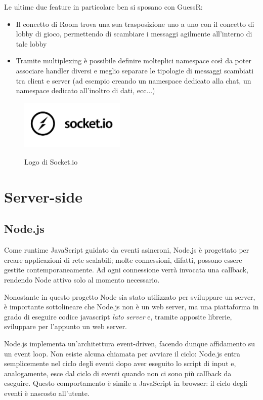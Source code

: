 \noindent Le ultime due feature in particolare ben si sposano con GuessR:
\begin{itemize}
    \item Il concetto di Room trova una sua trasposizione uno a uno con il concetto di lobby di gioco, permettendo di scambiare i messaggi agilmente all'interno di tale lobby
    \item Tramite multiplexing è possibile definire molteplici namespace così da poter associare handler diversi e meglio separare le tipologie di messaggi scambiati tra client e server (ad esempio creando un namespace dedicato alla chat, un namespace dedicato all'inoltro di dati, ecc...)
\end{itemize}


\begin{figure}[H]
    \caption{Logo di Socket.io}
    \centering
    \includegraphics[width=50mm]{img/logos/socketIO_logo.jpg}
    \label{fig:sockIO_logo}
\end{figure}

\section{Server-side}
\label{sub:server-tech}


\subsection{Node.js}
Come runtime JavaScript guidato da eventi asincroni, Node.js è progettato per creare applicazioni di rete scalabili; molte connessioni, difatti, possono essere gestite contemporaneamente. Ad ogni connessione verrà invocata una callback, rendendo Node attivo solo al momento necessario.\newline

\noindent Nonostante in questo progetto Node sia stato utilizzato per sviluppare un server, è importante sottolineare che Node.js non è un web server, ma una piattaforma in grado di eseguire codice javascript \textit{lato server} e, tramite apposite librerie, sviluppare per l'appunto un web server.\newline

\noindent Node.js implementa un'architettura event-driven, facendo dunque affidamento su un event loop. Non esiste alcuna chiamata per avviare il ciclo: Node.js entra semplicemente nel ciclo degli eventi dopo aver eseguito lo script di input e, analogamente, esce dal ciclo di eventi quando non ci sono più callback da eseguire. Questo comportamento è simile a JavaScript in browser: il ciclo degli eventi è nascosto all'utente.\newline

